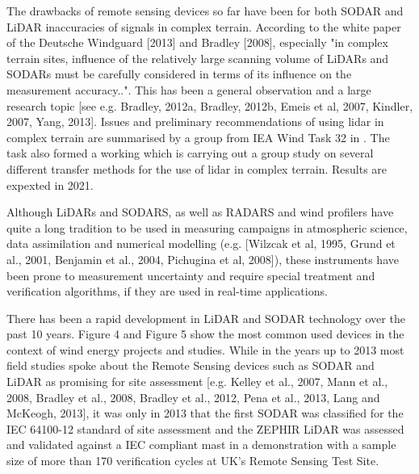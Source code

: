The drawbacks of remote sensing devices so far have been for both SODAR and LiDAR inaccuracies of signals in complex terrain. According to the white paper of the Deutsche Windguard [2013] and Bradley [2008], especially "in complex terrain sites, influence of the relatively large scanning volume of LiDARs and SODARs must be carefully considered in terms of its influence on the measurement accuracy..". This has been a general observation and a large research topic [see e.g. Bradley, 2012a, Bradley, 2012b, Emeis et al, 2007, Kindler, 2007, Yang, 2013].
Issues and preliminary recommendations of using lidar in complex terrain are summarised by a group from IEA Wind Task 32 in \citep{Clifton2013}. The task also formed a working which is carrying out a group study on several different transfer methods for the use of lidar in complex terrain. Results are expexted in 2021. 

Although LiDARs and SODARS, as well as RADARS and wind profilers have quite a long tradition to be used in measuring campaigns in atmospheric science, data assimilation and numerical modelling (e.g. [Wilzcak et al, 1995, Grund et al., 2001, Benjamin et al., 2004, Pichugina et al, 2008]), these instruments have been prone to measurement uncertainty and require special treatment and verification algorithms, if they are used in real-time applications. 


There has been a rapid development in LiDAR and SODAR technology over the past 10 years. Figure 4 and Figure 5 show the most common used devices in the context of wind energy projects and studies. While in the years up to 2013 most field studies spoke about the Remote Sensing devices such as SODAR and LiDAR as promising for site assessment [e.g. Kelley et al., 2007, Mann et al., 2008, Bradley et al., 2008, Bradley et al., 2012, Pena et al., 2013, Lang and McKeogh, 2013], it was only in 2013 that the first SODAR was classified for the IEC 64100-12 standard of site assessment and the ZEPHIR LiDAR was assessed and validated against a IEC compliant mast in a demonstration with a sample size of more than 170 verification cycles at UK’s Remote Sensing Test Site.\\ 

